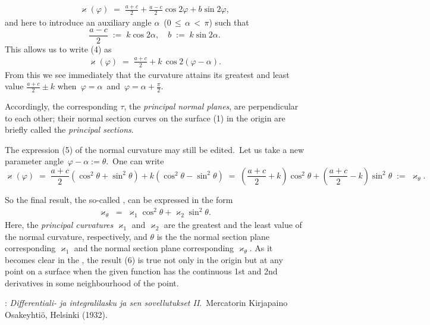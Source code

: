 \documentclass[12pt]{article}
\theoremstyle{definition}
\begin{document}
\begin{align}
\varkappa(\varphi) \;=\; \frac{a\!+\!c}{2}+\frac{a\!-\!c}{2}\cos2\varphi+b\sin2\varphi,
\end{align}
and here to introduce an auxiliary angle $\alpha$\, ($0 \,\le\, \alpha \,<\, \pi$) such that
$$\frac{a\!-\!c}{2} \;:=\; k\cos2\alpha,\quad b \;:=\; k\sin2\alpha.$$
This allows us to write (4) as
\begin{align}
\varkappa(\varphi) \;=\; \frac{a\!+\!c}{2}+k\,\cos2(\varphi\!-\!\alpha).
\end{align}
From this we see immediately that the curvature attains its greatest and least value 
$\displaystyle\frac{a\!+\!c}{2}\pm k$ when\, $\varphi = \alpha$\, and\, $\varphi = \alpha\!+\!\frac{\pi}{2}$.

Accordingly, the corresponding  $\tau$, the {\em principal normal planes}, are perpendicular to each other; their normal section curves on the surface (1) in the origin are briefly called the {\em principal sections}.

The expression (5) of the normal curvature may still be edited.\, Let us take a new parameter angle\, $\varphi-\alpha := \theta$.\, One can write
$$\varkappa(\varphi) \;=\; \frac{a\!+\!c}{2}(\cos^2\theta+\sin^2\theta)+k(\cos^2\theta-\sin^2\theta) 
\;=\; \left(\!\frac{a\!+\!c}{2}+k\!\right)\cos^2\theta+\left(\!\frac{a\!+\!c}{2}-k\!\right)\sin^2\theta 
\;:=\; \varkappa_\theta.$$

So the final result, the so-called {\em {}}, can be expressed in the form
\begin{align}
\varkappa_\theta \;=\; \varkappa_1\cos^2\theta+\varkappa_2\sin^2\theta.
\end{align}
Here, the {\em principal curvatures} $\varkappa_1$ and $\varkappa_2$ are the greatest and the least value of the normal curvature, respectively, and $\theta$ is the  the normal section plane corresponding $\varkappa_1$ and the normal section plane corresponding $\varkappa_\theta$.  As it becomes clear in the , the result (6) is true not only in the origin but at any point on a surface when the given function has the continuous 1st and 2nd derivatives in some neighbourhood of the point.


\begin{thebibliography}{8}
: {\em Differentiali- ja integralilasku
ja sen sovellutukset II}.\, Mercatorin Kirjapaino Osakeyhti\"o, Helsinki (1932).
\end{thebibliography} 

\end{document}
